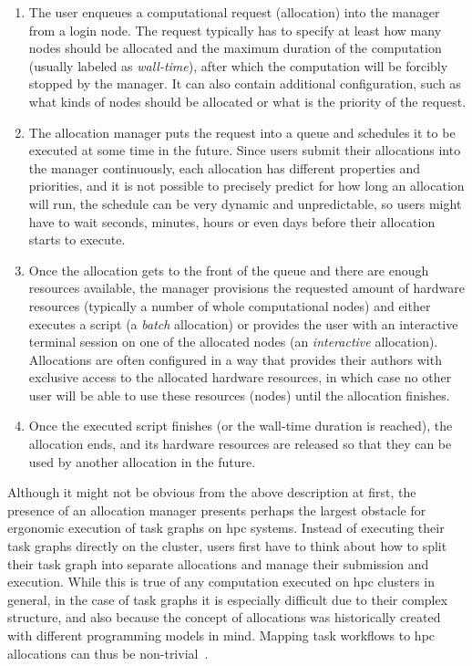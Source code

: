 \begin{enumerate}
	\item The user enqueues a computational request (allocation) into the manager from a login node. The
	      request typically has to specify at least how many nodes should be allocated and the maximum
	      duration of the computation (usually labeled as \emph{wall-time}), after which the computation
	      will be forcibly stopped by the manager. It can also contain additional configuration, such as what
	      kinds of nodes should be allocated or what is the priority of the request.
	\item The allocation manager puts the request into a queue and schedules it to be executed at some time
	      in the future. Since users submit their allocations into the manager continuously, each allocation
	      has different properties and priorities, and it is not possible to precisely predict for how long
	      an allocation will run, the schedule can be very dynamic and unpredictable, so users might have to
	      wait seconds, minutes, hours or even days before their allocation starts to execute.
	\item Once the allocation gets to the front of the queue and there are enough resources available, the
	      manager provisions the requested amount of hardware resources (typically a number of whole
	      computational nodes) and either executes a script (a \emph{batch} allocation) or provides
	      the user with an interactive terminal session on one of the allocated nodes (an
	      \emph{interactive} allocation). Allocations are often configured in a way that provides their
	      authors with exclusive access to the allocated hardware resources, in which case no other user will
	      be able to use these resources (nodes) until the allocation finishes.
	\item Once the executed script finishes (or the wall-time duration is reached), the allocation ends, and
	      its hardware resources are released so that they can be used by another allocation in the future.
\end{enumerate}

Although it might not be obvious from the above description at first, the presence of an allocation
manager presents perhaps the largest obstacle for ergonomic execution of task graphs on
\gls{hpc} systems. Instead of executing their task graphs directly on the cluster,
users first have to think about how to split their task graph into separate allocations and manage
their submission and execution. While this is true of any computation executed on
\gls{hpc} clusters in general, in the case of task graphs it is especially difficult
due to their complex structure, and also because the concept of allocations was historically
created with different programming models in mind. Mapping task workflows to \gls{hpc}
allocations can thus be non-trivial~\cite{glume,slurm-workflow}.


